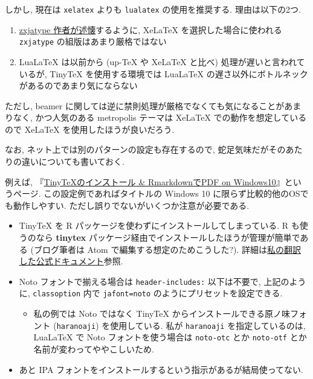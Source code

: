 \documentclass[
  letterpaper,
  DIV=11,
  pandoc,
  ja=standard,
  jafont=noto-otf]{bxjsarticle}
\providecommand{\tightlist}{%
  \setlength{\itemsep}{0pt}\setlength{\parskip}{0pt}}
\begin{document}
しかし, 現在は \texttt{xelatex} よりも \texttt{lualatex}
の使用を推奨する. 理由は以下の2つ.

\begin{enumerate}
\def\labelenumi{\arabic{enumi}.}
\tightlist
\item
  \href{https://zrbabbler.hatenablog.com/entry/2020/02/09/223244}{zxjatype
  作者が述懐}するように, XeLaTeX を選択した場合に使われる
  \texttt{zxjatype} の組版はあまり厳格ではない
\item
  LuaLaTeX は以前から (up-TeX や XeLaTeX と比べ)
  処理が遅いと言われているが, TinyTeX を使用する環境では LuaLaTeX
  の遅さ以外にボトルネックがあるのであまり気にならない
\end{enumerate}

ただし, beamer
に関しては逆に禁則処理が厳格でなくても気になることがあまりなく,
かつ人気のある metropolis テーマは XeLaTeX での動作を想定しているので
XeLaTeX を使用したほうが良いだろう.

なお, ネット上では別のパターンの設定も存在するので,
蛇足気味だがそのあたりの違いについても書いておく.

例えば,
『\href{https://nonki1974.hateblo.jp/entry/2020/02/19/130138}{TinyTeXのインストール
\& RmarkdownでPDF on Windows10}』というページ.
この設定例であればタイトルの Windows 10
に限らず比較的他のOSでも動作しやすい.
ただし誤りでないがいくつか注意が必要である.

\begin{itemize}
\tightlist
\item
  TinyTeX を R パッケージを使わずにインストールしてしまっている. R
  も使うのなら \textbf{tinytex}
  パッケージ経由でインストールしたほうが管理が簡単である (ブログ筆者は
  Atom で編集する想定のためこうした?).
  詳細は\href{https://gedevan-aleksizde.github.io/tinytex-doc-ja/index.html}{私の翻訳した公式ドキュメント}参照.
\item
  Noto フォントで揃える場合は \texttt{header-includes:} 以下は不要で,
  上記のように, \texttt{classoption} 内で \texttt{jafont=noto}
  のようにプリセットを設定できる.

  \begin{itemize}
  \tightlist
  \item
    私の例では Noto ではなく TinyTeX
    からインストールできる原ノ味フォント (\texttt{haranoaji})
    を使用している. 私が \texttt{haranoaji} を指定しているのは, LuaLaTeX
    で Noto フォントを使う場合は \texttt{noto-otc} とか
    \texttt{noto-otf} とか名前が変わってややこしいため.
  \end{itemize}
\item
  あと IPA フォントをインストールするという指示があるが結局使ってない.
\end{itemize}
\end{document}
